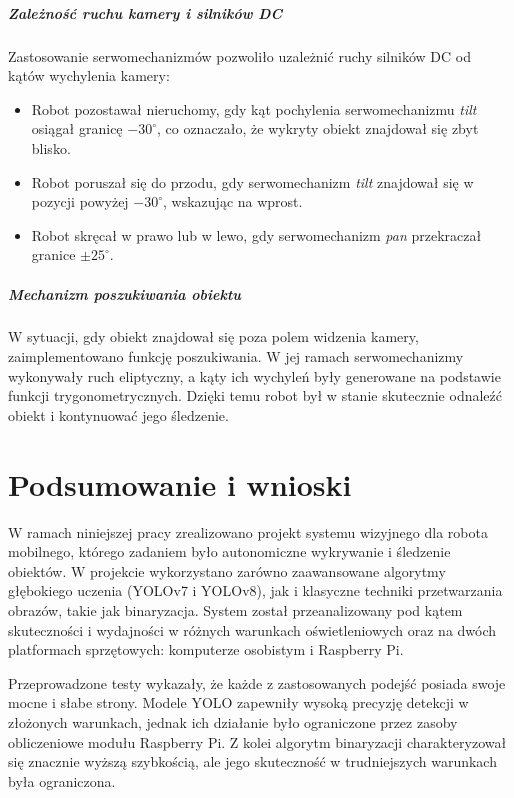 \documentclass[a4paper,twoside,12pt]{book}
\begin{document}
\paragraph{Zależność ruchu kamery i silników DC}
Zastosowanie serwomechanizmów pozwoliło uzależnić ruchy silników DC od kątów wychylenia kamery:
\begin{itemize}
    \item Robot pozostawał nieruchomy, gdy kąt pochylenia serwomechanizmu \textit{tilt} osiągał granicę \(-30^\circ\), co oznaczało, że wykryty obiekt znajdował się zbyt blisko.
    \item Robot poruszał się do przodu, gdy serwomechanizm \textit{tilt} znajdował się w pozycji powyżej \(-30^\circ\), wskazując na wprost.
    \item Robot skręcał w prawo lub w lewo, gdy serwomechanizm \textit{pan} przekraczał granice \(\pm 25^\circ\).
\end{itemize}

\paragraph{Mechanizm poszukiwania obiektu}
W sytuacji, gdy obiekt znajdował się poza polem widzenia kamery, zaimplementowano funkcję poszukiwania. W jej ramach serwomechanizmy wykonywały ruch eliptyczny, a kąty ich wychyleń były generowane na podstawie funkcji trygonometrycznych. Dzięki temu robot był w stanie skutecznie odnaleźć obiekt i kontynuować jego śledzenie.

\chapter{Podsumowanie i wnioski}
\label{ch:07}

W ramach niniejszej pracy zrealizowano projekt systemu wizyjnego dla robota mobilnego, którego zadaniem było autonomiczne wykrywanie i śledzenie obiektów. W projekcie wykorzystano zarówno zaawansowane algorytmy głębokiego uczenia (YOLOv7 i YOLOv8), jak i klasyczne techniki przetwarzania obrazów, takie jak binaryzacja. System został przeanalizowany pod kątem skuteczności i wydajności w różnych warunkach oświetleniowych oraz na dwóch platformach sprzętowych: komputerze osobistym i Raspberry Pi.

Przeprowadzone testy wykazały, że każde z zastosowanych podejść posiada swoje mocne i słabe strony. Modele YOLO zapewniły wysoką precyzję detekcji w złożonych warunkach, jednak ich działanie było ograniczone przez zasoby obliczeniowe modułu Raspberry Pi. Z kolei algorytm binaryzacji charakteryzował się znacznie wyższą szybkością, ale jego skuteczność w trudniejszych warunkach była ograniczona.
\end{document}
